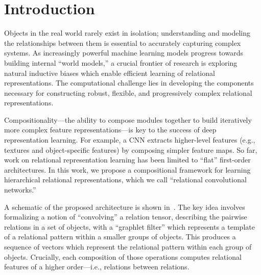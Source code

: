 \section{Introduction}\label{sec:intro}

Objects in the real world rarely exist in isolation; understanding and modeling the relationships between them is essential to accurately capturing complex systems. As increasingly powerful machine learning models progress towards building internal ``world models,'' a crucial frontier of research is exploring natural inductive biases which enable efficient learning of relational representations. The computational challenge lies in developing the components necessary for constructing robust, flexible, and progressively complex relational representations.


Compositionality---the ability to compose modules together to build iteratively more complex feature representations---is key to the success of deep representation learning. 
For example, a CNN extracts higher-level features (e.g., textures and object-specific features) by composing simpler feature maps.
So far, work on relational representation learning has been limited to ``flat'' first-order architectures. In this work, we propose a compositional framework for learning hierarchical relational representations, which we call ``relational convolutional networks.''

A schematic of the proposed architecture is shown in~. The key idea involves formalizing a notion of ``convolving'' a relation tensor, describing the pairwise relations in a set of objects, with a ``graphlet filter'' which represents a template of a relational pattern within a smaller groups of objects. This produces a sequence of vectors which represent the relational pattern within each group of objects. Crucially, each composition of those operations computes relational features of a higher order---i.e., relations between relations.

